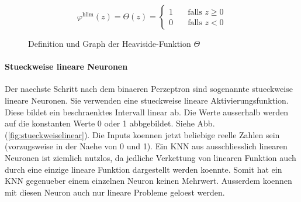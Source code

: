\documentclass[../main]{subfiles}
\begin{document}
\begin{figure}[h!]
  \begin{minipage}[h!]{0.5\textwidth}
    \begin{equation*}
      \varphi^{\text{hlim}}(z) = \Theta(z) =
      \begin{cases}
        1 & \quad \text{falls } z \geq 0\\
        0 & \quad \text{falls } z < 0
      \end{cases}
    \end{equation*}

  \end{minipage}
  \begin{minipage}[h!]{0.5\textwidth}
    \centering
  \end{minipage}

  \caption{Definition und Graph der Heaviside-Funktion $\Theta$}
  \label{fig:heaviside}
\end{figure}

\paragraph{Stueckweise lineare Neuronen}
Der naechste Schritt nach dem binaeren Perzeptron sind sogenannte stueckweise
lineare Neuronen.
Sie verwenden eine stueckweise lineare Aktivierungsfunktion. Diese bildet ein
beschraenktes Intervall linear ab. Die Werte ausserhalb werden auf die
konstanten Werte 0 oder 1 abbgebildet. Siehe Abb. (\ref{fig:stueckweiselinear}).
\para{}
Die Inputs koennen jetzt beliebige reelle Zahlen sein (vorzugsweise in der Naehe
von 0 und 1).
Ein KNN aus ausschliesslich linearen Neuronen ist ziemlich nutzlos, da jedliche Verkettung von
linearen Funktion auch durch eine einzige lineare Funktion dargestellt werden
koennte. Somit hat ein KNN gegenueber einem einzelnen Neuron keinen Mehrwert.
Ausserdem koennen mit diesen Neuron auch nur lineare Probleme geloest werden.
\end{document}
